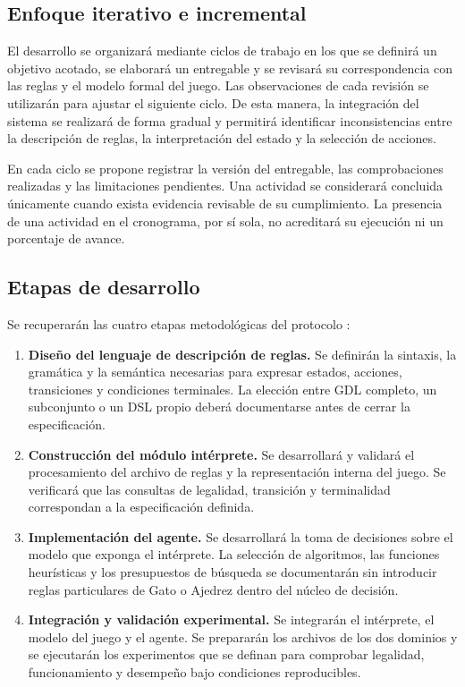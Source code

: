\subsection{Enfoque iterativo e incremental}

El desarrollo se organizará mediante ciclos de trabajo en los que se definirá un objetivo acotado, se elaborará un entregable y se revisará su correspondencia con las reglas y el modelo formal del juego. Las observaciones de cada revisión se utilizarán para ajustar el siguiente ciclo. De esta manera, la integración del sistema se realizará de forma gradual y permitirá identificar inconsistencias entre la descripción de reglas, la interpretación del estado y la selección de acciones.

En cada ciclo se propone registrar la versión del entregable, las comprobaciones realizadas y las limitaciones pendientes. Una actividad se considerará concluida únicamente cuando exista evidencia revisable de su cumplimiento. La presencia de una actividad en el cronograma, por sí sola, no acreditará su ejecución ni un porcentaje de avance.

\subsection{Etapas de desarrollo}

Se recuperarán las cuatro etapas metodológicas del protocolo \cite{ProtocoloTT2027A178}:

\begin{enumerate}
    \item \textbf{Diseño del lenguaje de descripción de reglas.} Se definirán la sintaxis, la gramática y la semántica necesarias para expresar estados, acciones, transiciones y condiciones terminales. La elección entre GDL completo, un subconjunto o un DSL propio deberá documentarse antes de cerrar la especificación.
    \item \textbf{Construcción del módulo intérprete.} Se desarrollará y validará el procesamiento del archivo de reglas y la representación interna del juego. Se verificará que las consultas de legalidad, transición y terminalidad correspondan a la especificación definida.
    \item \textbf{Implementación del agente.} Se desarrollará la toma de decisiones sobre el modelo que exponga el intérprete. La selección de algoritmos, las funciones heurísticas y los presupuestos de búsqueda se documentarán sin introducir reglas particulares de Gato o Ajedrez dentro del núcleo de decisión.
    \item \textbf{Integración y validación experimental.} Se integrarán el intérprete, el modelo del juego y el agente. Se prepararán los archivos de los dos dominios y se ejecutarán los experimentos que se definan para comprobar legalidad, funcionamiento y desempeño bajo condiciones reproducibles.
\end{enumerate}

